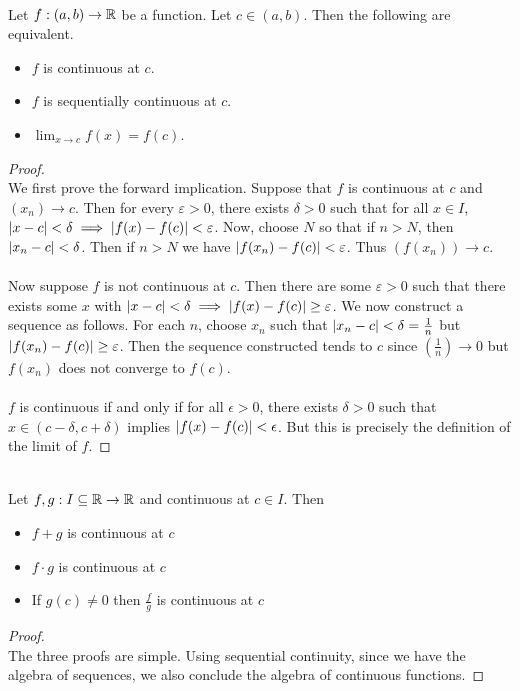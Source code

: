 \documentclass[a4paper]{article}
\begin{document}
\begin{thm}{}{}\\ Let $f:(a,b)\to\mathbb{R}$ be a function. Let $c\in (a,b)$. Then the following are equivalent. 
\begin{itemize}
\item $f$ is continuous at $c$. 
\item $f$ is sequentially continuous at $c$. 
\item $\lim_{x\to c}f(x)=f(c)$. 
\end{itemize} 
\begin{proof}\\ We first prove the forward implication. Suppose that $f$ is continuous at $c$ and $(x_n)\to c$. Then for every $\varepsilon>0$, there exists $\delta>0$ such that for all $x\in I$, $\abs{x-c}<\delta\implies\abs{f(x)-f(c)}<\varepsilon$. Now, choose $N$ so that if $n>N$, then $\abs{x_n-c}<\delta$. Then if $n>N$ we have $\abs{f(x_n)-f(c)}<\varepsilon$. Thus $\left(f(x_n)\right)\to c$. \\~\\
Now suppose $f$ is not continuous at $c$. Then there are some $\varepsilon>0$ such that there exists some $x$ with $\abs{x-c}<\delta\implies\abs{f(x)-f(c)}\geq\varepsilon$. We now construct a sequence as follows. For each $n$, choose $x_n$ such that $\abs{x_n-c}<\delta=\frac{1}{n}$ but $\abs{f(x_n)-f(c)}\geq\varepsilon$. Then the sequence constructed tends to $c$ since $\left(\frac{1}{n}\right)\to0$ but $f(x_n)$ does not converge to $f(c)$. \\~\\

$f$ is continuous if and only if for all $\epsilon>0$, there exists $\delta>0$ such that $x\in(c-\delta,c+\delta)$ implies $\abs{f(x)-f(c)}<\epsilon$. But this is precisely the definition of the limit of $f$. 
\end{proof}
\end{thm}

\begin{prp}{}{}\\ Let $f,g:I\subseteq\mathbb{R}\to\mathbb{R}$ and continuous at $c\in I$. Then
\begin{itemize}
\item $f+g$ is continuous at $c$
\item $f\cdot g$ is continuous at $c$
\item If $g(c)\neq0$ then $\frac{f}{g}$ is continuous at $c$
\end{itemize}
\begin{proof}\\ The three proofs are simple. Using sequential continuity, since we have the algebra of sequences, we also conclude the algebra of continuous functions. 
\end{proof}
\end{prp}
\end{document}
